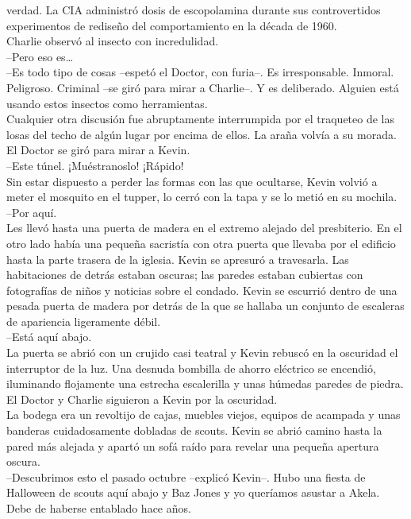 verdad. La CIA administró dosis de escopolamina durante sus
controvertidos experimentos de rediseño del comportamiento en la década
de 1960.\\
Charlie observó al insecto con incredulidad.\\
--Pero eso es\ldots{}\\
--Es todo tipo de cosas --espetó el Doctor, con furia--. Es
irresponsable. Inmoral. Peligroso. Criminal --se giró para mirar a
Charlie--. Y es deliberado. Alguien está usando estos insectos como
herramientas.\\
Cualquier otra discusión fue abruptamente interrumpida por el traqueteo
de las losas del techo de algún lugar por encima de ellos. La araña
volvía a su morada.\\
El Doctor se giró para mirar a Kevin.\\
--Este túnel. ¡Muéstranoslo! ¡Rápido!\\
Sin estar dispuesto a perder las formas con las que ocultarse, Kevin
volvió a meter el mosquito en el tupper, lo cerró con la tapa y se lo
metió en su mochila.\\
--Por aquí.\\
Les llevó hasta una puerta de madera en el extremo alejado del
presbiterio. En el otro lado había una pequeña sacristía con otra puerta
que llevaba por el edificio hasta la parte trasera de la iglesia. Kevin
se apresuró a travesarla. Las habitaciones de detrás estaban oscuras;
las paredes estaban cubiertas con fotografías de niños y noticias sobre
el condado. Kevin se escurrió dentro de una pesada puerta de madera por
detrás de la que se hallaba un conjunto de escaleras de apariencia
ligeramente débil.\\
--Está aquí abajo.\\
La puerta se abrió con un crujido casi teatral y Kevin rebuscó en la
oscuridad el interruptor de la luz. Una desnuda bombilla de ahorro
eléctrico se encendió, iluminando flojamente una estrecha escalerilla y
unas húmedas paredes de piedra. El Doctor y Charlie siguieron a Kevin
por la oscuridad.\\
La bodega era un revoltijo de cajas, muebles viejos, equipos de acampada
y unas banderas cuidadosamente dobladas de scouts. Kevin se abrió camino
hasta la pared más alejada y apartó un sofá raído para revelar una
pequeña apertura oscura.\\
--Descubrimos esto el pasado octubre --explicó Kevin--. Hubo una fiesta
de Halloween de scouts aquí abajo y Baz Jones y yo queríamos asustar a
Akela. Debe de haberse entablado hace años.\\

